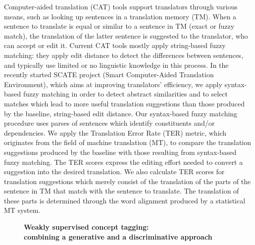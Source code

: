 \documentclass[10pt, a4paper, twopage, headinclude, footinclude, BCOR5mm]{scrartcl}
\begin{document}
\noindent
Computer-aided translation (CAT) tools support translators through various means, such as looking up sentences in a translation memory (TM). When a sentence to translate is equal or similar to a sentence in TM (exact or fuzzy match), the translation of the latter sentence is suggested to the translator, who can accept or edit it. Current CAT tools mostly apply string-based fuzzy matching: they apply edit distance to detect the differences between sentences, and typically use limited or no linguistic knowledge in this process. In the recently started SCATE project (Smart Computer-Aided Translation Environment), which aims at improving translators’ efficiency, we apply syntax-based fuzzy matching in order to detect abstract similarities and to select matches which lead to more useful translation suggestions than those produced by the baseline, string-based edit distance. Our syntax-based fuzzy matching procedure uses parses of sentences which identify constituents and/or dependencies. We apply the Translation Error Rate (TER) metric, which originates from the field of machine translation (MT), to compare the translation suggestions produced by the baseline with those resulting from syntax-based fuzzy matching. The TER scores express the editing effort needed to convert a suggestion into the desired translation. We also calculate TER scores for translation suggestions which merely consist of the translation of the parts of the sentence in TM that match with the sentence to translate. The translation of these parts is determined through the word alignment produced by a statistical MT system.


\newpage

\begin{figure}[t!]
\centering
\large\textbf{Weakly supervised concept tagging: \\ combining a generative and a discriminative approach}
\vspace*{0.5cm}
\end{figure}


        \begin{table}[t!]
    \end{table}
\end{document}
